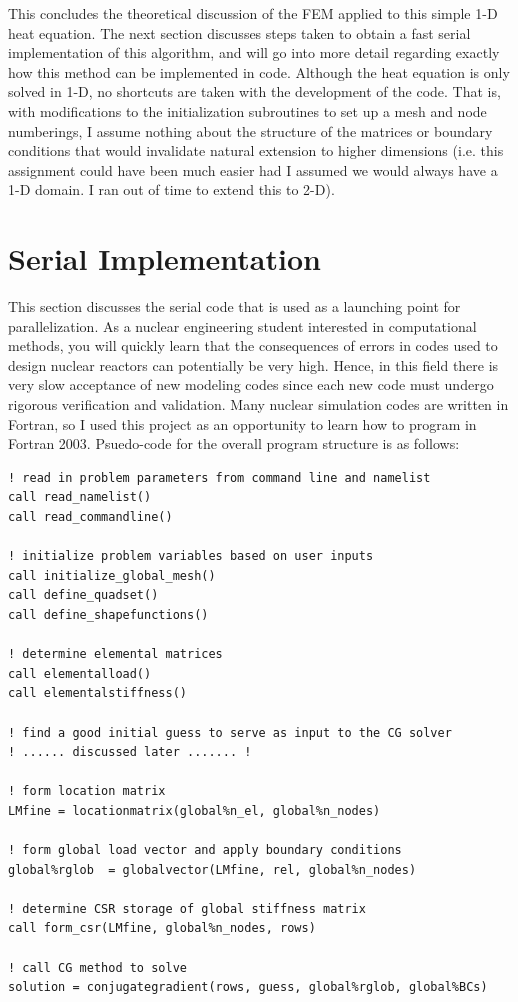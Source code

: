 \documentclass[10pt]{article}
\begin{document}
This concludes the theoretical discussion of the FEM applied to this simple 1-D heat equation. The next section discusses steps taken to obtain a fast serial implementation of this algorithm, and will go into more detail regarding exactly how this method can be implemented in code. Although the heat equation is only solved in 1-D, no shortcuts are taken with the development of the code. That is, with modifications to the initialization subroutines to set up a mesh and node numberings, I assume nothing about the structure of the matrices or boundary conditions that would invalidate natural extension to higher dimensions (i.e. this assignment could have been much easier had I assumed we would always have a 1-D domain. I ran out of time to extend this to 2-D).

\section{Serial Implementation}

This section discusses the serial code that is used as a launching point for parallelization. As a nuclear engineering student interested in computational methods, you will quickly learn that the consequences of errors in codes used to design nuclear reactors can potentially be very high. Hence, in this field there is very slow acceptance of new modeling codes since each new code must undergo rigorous verification and validation. Many nuclear simulation codes are written in Fortran, so I used this project as an opportunity to learn how to program in Fortran 2003. Psuedo-code for the overall program structure is as follows:

\begin{lstlisting}
! read in problem parameters from command line and namelist
call read_namelist()
call read_commandline()

! initialize problem variables based on user inputs
call initialize_global_mesh()
call define_quadset()
call define_shapefunctions()

! determine elemental matrices
call elementalload()
call elementalstiffness()

! find a good initial guess to serve as input to the CG solver
! ...... discussed later ....... !

! form location matrix
LMfine = locationmatrix(global%n_el, global%n_nodes)

! form global load vector and apply boundary conditions
global%rglob  = globalvector(LMfine, rel, global%n_nodes)

! determine CSR storage of global stiffness matrix
call form_csr(LMfine, global%n_nodes, rows)

! call CG method to solve
solution = conjugategradient(rows, guess, global%rglob, global%BCs)
\end{lstlisting}
\end{document}
